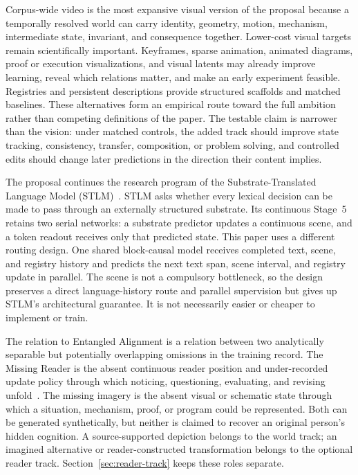 \documentclass[11pt]{article}
\begin{document}
Corpus-wide video is the most expansive visual version of the proposal because a temporally resolved world can carry identity, geometry, motion, mechanism, intermediate state, invariant, and consequence together. Lower-cost visual targets remain scientifically important. Keyframes, sparse animation, animated diagrams, proof or execution visualizations, and visual latents may already improve learning, reveal which relations matter, and make an early experiment feasible. Registries and persistent descriptions provide structured scaffolds and matched baselines. These alternatives form an empirical route toward the full ambition rather than competing definitions of the paper. The testable claim is narrower than the vision: under matched controls, the added track should improve state tracking, consistency, transfer, composition, or problem solving, and controlled edits should change later predictions in the direction their content implies.

The proposal continues the research program of the Substrate-Translated Language Model (STLM)~\cite{westerberg2026stlm}. STLM asks whether every lexical decision can be made to pass through an externally structured substrate. Its continuous Stage~5 retains two serial networks: a substrate predictor updates a continuous scene, and a token readout receives only that predicted state. This paper uses a different routing design. One shared block-causal model receives completed text, scene, and registry history and predicts the next text span, scene interval, and registry update in parallel. The scene is not a compulsory bottleneck, so the design preserves a direct language-history route and parallel supervision but gives up STLM's architectural guarantee. It is not necessarily easier or cheaper to implement or train.

The relation to Entangled Alignment is a relation between two analytically separable but potentially overlapping omissions in the training record. The Missing Reader is the absent continuous reader position and under-recorded update policy through which noticing, questioning, evaluating, and revising unfold~\cite{westerberg2026entangled}. The missing imagery is the absent visual or schematic state through which a situation, mechanism, proof, or program could be represented. Both can be generated synthetically, but neither is claimed to recover an original person's hidden cognition. A source-supported depiction belongs to the world track; an imagined alternative or reader-constructed transformation belongs to the optional reader track. Section~\ref{sec:reader-track} keeps these roles separate.
\end{document}
